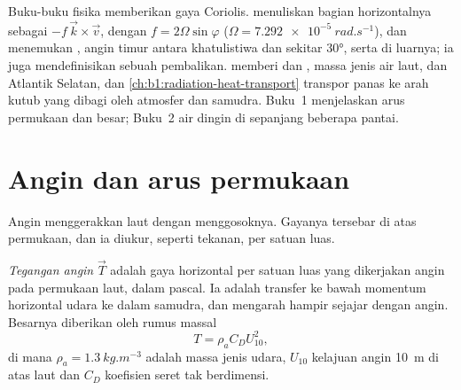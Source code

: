 \begin{recall}
Buku-buku fisika memberikan gaya Coriolis.  menuliskan bagian horizontalnya sebagai $-f\,\vec k\times\vec v$, dengan  $f = 2\Omega\sin\varphi$ ($\Omega = \qty{7.292e-5}{rad.s^{-1}}$), dan menemukan , angin timur antara khatulistiwa dan sekitar \ang{30}, serta  di luarnya; ia juga mendefinisikan  sebuah pembalikan.  memberi  dan , massa jenis air laut,  dan  Atlantik Selatan, dan \cref{ch:b1:radiation-heat-transport} transpor panas ke arah kutub yang dibagi oleh atmosfer dan samudra. Buku~1 menjelaskan arus permukaan dan  besar; Buku~2  air dingin di sepanjang beberapa pantai.
\end{recall}

\section{Angin dan arus permukaan}\label{sec:b1:ocean-circulation:wind}

Angin menggerakkan laut dengan menggosoknya. Gayanya tersebar di atas permukaan, dan ia diukur, seperti tekanan, per satuan luas.

\begin{definition}\label{def:b1:ocean-circulation:wind-stress}
\emph{Tegangan angin} $\vec T$ adalah gaya horizontal per satuan luas yang dikerjakan angin pada permukaan laut, dalam pascal. Ia adalah transfer ke bawah momentum horizontal udara ke dalam samudra, dan mengarah hampir sejajar dengan angin. Besarnya diberikan oleh rumus massal
\[
  T = \rho_a C_D U_{10}^2,
\]
di mana $\rho_a = \qty{1.3}{kg.m^{-3}}$ adalah massa jenis udara, $U_{10}$ kelajuan angin \qty{10}{m} di atas laut dan $C_D$ koefisien seret tak berdimensi.
\end{definition}

